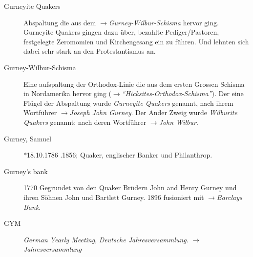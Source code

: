 \begin{description}
\item[Gurneyite Quakers] Abspaltung die aus dem $\to$\textit{Gurney-Wilbur-Schisma}
hervor ging. Gurneyite Quakers gingen dazu über, bezahlte Pediger/Pastoren,
festgelegte Zeromomien und Kirchengesang ein zu führen. Und lehnten sich dabei
sehr stark an den Protestantismus an.

\item[Gurney-Wilbur-Schisma]
Eine aufspaltung der Orthodox-Linie die aus dem ersten Grossen Schisma in
Nordamerika hervor ging ($\to$\textit{"`Hicksites-Orthodox-Schisma"'}). Der
eine Flügel der Abspaltung wurde \textit{Gurneyite Quakers} genannt, nach
ihrem Wortführer $\to$\textit{Joseph John Gurney}. Der Ander Zweig wurde
\textit{Wilburite Quakers} genannt; nach deren Wortführer
$\to$\textit{John Wilbur}.


\item[Gurney, Samuel] $\ast$18.10.1786 .1856; Quaker, englischer Banker und
Philanthrop.

\item[Gurney's bank] 1770 Gegrundet von den Quaker Brüdern John and Henry Gurney und
ihren Söhnen John und Bartlett Gurney. 1896 fusioniert mit
$\to$\textit{Barclays Bank}.

\item[GYM] \textit{German Yearly Meeting}, \textit{Deutsche Jahresversammlung}. $\to$\textit{Jahresversammlung}
 \end{description}

\normalsize